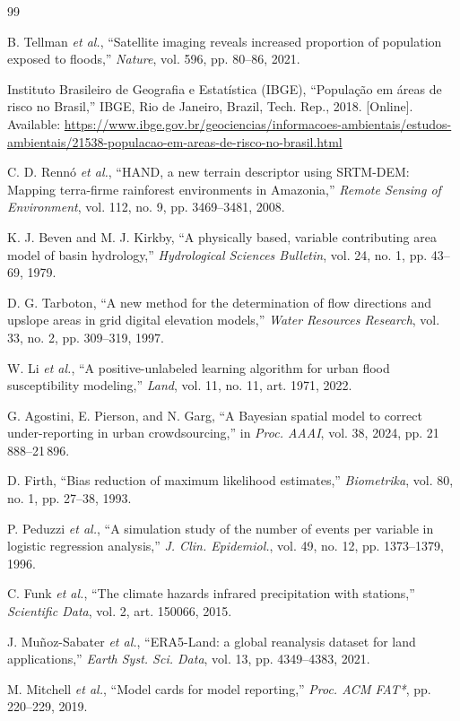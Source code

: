 \documentclass[conference]{IEEEtran}
\begin{document}
\fontsize{5.7}{6.2}\selectfont
\begin{thebibliography}{99}
\setlength{\itemsep}{0.4pt}
\setlength{\parskip}{0pt}

B. Tellman \emph{et al.}, ``Satellite imaging reveals increased proportion of
population exposed to floods,'' \emph{Nature}, vol. 596, pp. 80--86, 2021.

Instituto Brasileiro de Geografia e Estatística (IBGE), ``População em áreas
de risco no Brasil,'' IBGE, Rio de Janeiro, Brazil, Tech. Rep., 2018. [Online].
Available: \url{https://www.ibge.gov.br/geociencias/informacoes-ambientais/estudos-ambientais/21538-populacao-em-areas-de-risco-no-brasil.html}

C. D. Rennó \emph{et al.}, ``HAND, a new terrain descriptor using SRTM-DEM:
Mapping terra-firme rainforest environments in Amazonia,''
\emph{Remote Sensing of Environment}, vol. 112, no. 9, pp. 3469--3481, 2008.

K. J. Beven and M. J. Kirkby, ``A physically based, variable contributing area
model of basin hydrology,'' \emph{Hydrological Sciences Bulletin}, vol. 24,
no. 1, pp. 43--69, 1979.

D. G. Tarboton, ``A new method for the determination of flow directions and
upslope areas in grid digital elevation models,'' \emph{Water Resources
Research}, vol. 33, no. 2, pp. 309--319, 1997.

W. Li \emph{et al.}, ``A positive-unlabeled learning algorithm for urban flood
susceptibility modeling,'' \emph{Land},
vol. 11, no. 11, art. 1971, 2022.

G. Agostini, E. Pierson, and N. Garg, ``A Bayesian spatial model to correct
under-reporting in urban crowdsourcing,'' in \emph{Proc. AAAI}, vol. 38, 2024,
pp. 21\,888--21\,896.

D. Firth, ``Bias reduction of maximum likelihood estimates,''
\emph{Biometrika}, vol. 80, no. 1, pp. 27--38, 1993.

P. Peduzzi \emph{et al.}, ``A simulation study of the number of events per
variable in logistic regression analysis,'' \emph{J. Clin. Epidemiol.}, vol. 49,
no. 12, pp. 1373--1379, 1996.

C. Funk \emph{et al.}, ``The climate hazards infrared precipitation with
stations,'' \emph{Scientific Data}, vol. 2, art. 150066, 2015.

J. Muñoz-Sabater \emph{et al.}, ``ERA5-Land: a global reanalysis dataset for land
applications,'' \emph{Earth Syst. Sci. Data}, vol. 13, pp. 4349--4383, 2021.

M. Mitchell \emph{et al.}, ``Model cards for model reporting,'' \emph{Proc. ACM
FAT*}, pp. 220--229, 2019.

\end{thebibliography}
\end{document}
